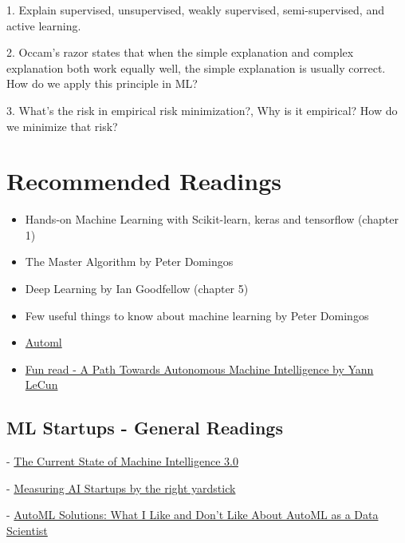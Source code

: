 \documentclass[openany]{book}
\begin{document}
1. Explain supervised, unsupervised, weakly supervised, semi-supervised, and active learning.

2. Occam's razor states that when the simple explanation and complex explanation both work equally well, the simple explanation is usually correct. How do we apply this principle in ML?

3. What’s the risk in empirical risk minimization?, Why is it empirical? How do we minimize that risk?


\section{Recommended Readings}

\begin{itemize}
    \item Hands-on Machine Learning with Scikit-learn, keras and tensorflow (chapter 1) 

    \item The Master Algorithm by Peter Domingos 
    
    \item Deep Learning by Ian Goodfellow (chapter 5) 
    
    \item Few useful things to know about machine learning by Peter Domingos 

    \item \href{https://alexandruburlacu.github.io/posts/2022-07-05-neptuneai-automl}{Automl}

    \item \href{https://openreview.net/pdf?id=BZ5a1r-kVsf}{Fun read - A Path Towards Autonomous Machine Intelligence by Yann LeCun}

    

    
\end{itemize}




\subsection{ML Startups - General Readings}

- \href{http://www.shivonzilis.com/ }{The Current State of Machine Intelligence 3.0}

- \href{https://techcrunch.com/2018/09/06/measuring-ai-startups-by-the-right-yardstick/  }{Measuring AI Startups by the right yardstick}

- \href{https://alexandruburlacu.github.io/posts/2022-07-05-neptuneai-automl}{AutoML Solutions: What I Like and Don’t Like About AutoML as a Data Scientist
}
 
\end{document}

